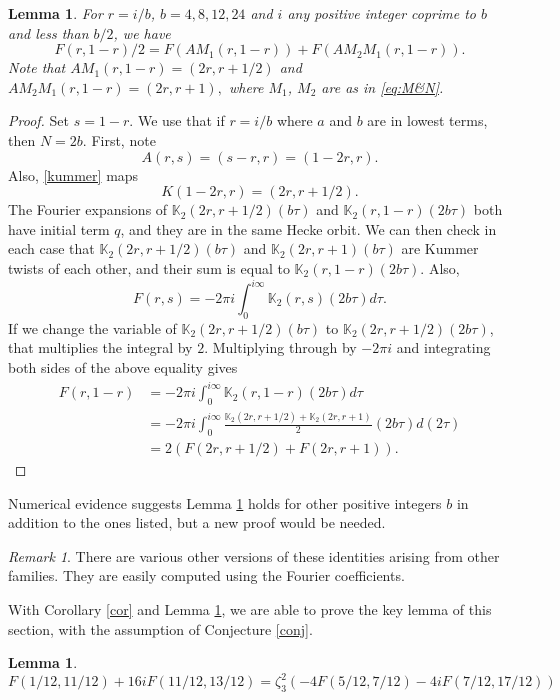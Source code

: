 \documentclass[12pt]{amsart}
\newtheorem{Lemma}[theorem]{Lemma}
\theoremstyle{definition}
\theoremstyle{remark}
\newtheorem{remark}{Remark}
\begin{document}
\begin{Lemma}\label{threeterm}
    For $r=i/b$, $b=4,8,12,24$ and $i$ any positive integer coprime to $b$ and less than $b/2$, we have $$F(r,1-r)/2=F(AM_1(r,1-r))+F(A M_2M_1(r,1-r)).$$ Note that $AM_1(r,1-r)=(2r,r+1/2)$ and $A M_2M_1(r,1-r)=(2r,r+1),$  where $M_1$, $M_2$ are as in \eqref{eq:M&N}.
\end{Lemma} 
\begin{proof} 
    Set $s=1-r$. We use that if $r=i/b$ where $a$ and $b$ are in lowest terms, then $N=2b$. First, note $$A(r,s)=(s-r,r)=(1-2r,r).$$  Also, \eqref{kummer} maps $$K(1-2r,r)=(2r,r+1/2).$$ The Fourier expansions of $\mathbb{K}_2(2r,r+1/2)(b\tau)$ and $\mathbb{K}_2(r,1-r)(2b\tau)$ both have initial term $q$, and they are in the same Hecke orbit. We can then check in each case that $\mathbb{K}_2(2r,r+1/2)(b\tau)$ and $\mathbb{K}_2(2r,r+1)(b\tau)$  are Kummer twists of each other, and their sum is equal to $\mathbb{K}_2(r,1-r)(2b\tau)$. Also, $$F(r,s)=-2\pi i\int_0^{i\infty}\mathbb{K}_2(r,s)(2b\tau)d\tau.$$ If we change the variable of $\mathbb{K}_2(2r,r+1/2)(b\tau)$ to $\mathbb{K}_2(2r,r+1/2)(2b\tau)$, that multiplies the integral by $2$. Multiplying through by $-2\pi i$ and integrating both sides of the above equality gives \begin{align*}
        F(r,1-r)&=-2\pi i\int_{0}^{i\infty} \mathbb{K}_2(r,1-r)(2b\tau)d\tau\\&
        =-2\pi i\int_0^{i\infty}\frac{\mathbb{K}_2(2r,r+1/2)+\mathbb{K}_2(2r,r+1)}{2}(2b\tau)d(2\tau)\\&=2(F(2r,r+1/2)+F(2r,r+1)).
    \end{align*} 
\end{proof}
 Numerical evidence suggests Lemma \ref{threeterm} holds for other positive integers $b$ in addition to the ones listed, but a new proof would be needed. 

 \smallskip
\begin{remark}
    There are various other versions of these identities arising from other families. They are easily computed using the Fourier coefficients.
\end{remark} 

With Corollary \ref{cor} and Lemma \ref{threeterm}, we are able to prove the key lemma of this section, with the assumption of Conjecture \ref{conj}.

\begin{Lemma}\label{l5}
     $$F(1/12, 11/12) + 16 i F(11/12, 13/12) = 
 \zeta_3^2 (-4 F(5/12, 7/12) - 4 i F(7/12, 17/12))$$
\end{Lemma}
\end{document}
